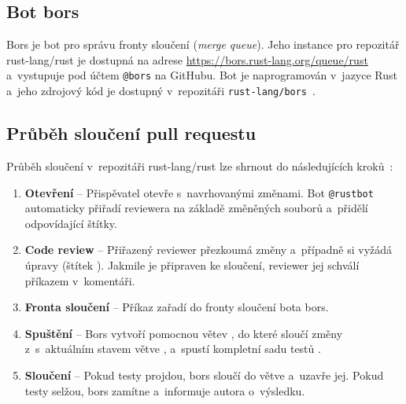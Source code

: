 \subsection{Bot bors}
\label{subsec:rust_merge_process:bors}

Bors je bot pro správu fronty sloučení (\textit{merge queue}). Jeho instance pro repozitář rust-lang/rust je dostupná na adrese \url{https://bors.rust-lang.org/queue/rust} a~vystupuje pod účtem \texttt{@bors} na GitHubu. Bot je naprogramován v~jazyce Rust a~jeho zdrojový kód je dostupný v~repozitáři \texttt{rust-lang/bors}~\cite{rust_lang_bors,forge_rust_bors}.

\subsection{Průběh sloučení pull requestu}
\label{subsec:rust_merge_process:workflow}

Průběh sloučení \PR v~repozitáři rust-lang/rust lze shrnout do následujících kroků~\cite{rustc_contributing}:

\begin{enumerate}
  \item \textbf{Otevření \PR} -- Přispěvatel otevře \PR s~navrhovanými změnami. Bot \texttt{@rustbot} automaticky přiřadí reviewera na základě změněných souborů a~přidělí odpovídající štítky.
  \item \textbf{Code review} -- Přiřazený reviewer přezkoumá změny a~případně si vyžádá úpravy (štítek ). Jakmile je \PR připraven ke sloučení, reviewer jej schválí příkazem  v~komentáři.
  \item \textbf{Fronta sloučení} -- Příkaz  zařadí \PR do fronty sloučení bota bors.
  \item \textbf{Spuštění \CI} -- Bors vytvoří pomocnou větev , do které sloučí změny z~\PR s~aktuálním stavem větve , a~spustí kompletní sadu testů \CI.
  \item \textbf{Sloučení} -- Pokud testy projdou, bors sloučí \PR do větve  a~uzavře jej. Pokud testy selžou, bors \PR zamítne a~informuje autora o~výsledku.
\end{enumerate}

